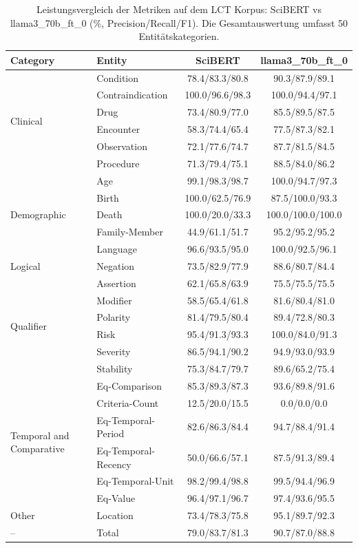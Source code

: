 
\begin{table}[htbp]
\centering
\begin{tabular}{llcc}
\toprule
\textbf{Category} & \textbf{Entity} & \textbf{SciBERT} & \textbf{llama3_70b_ft_0} \\
\midrule
\multirow{6}{*}{Clinical} & Condition & 78.4/83.3/80.8 & 90.3/87.9/89.1 \\
 & Contraindication & 100.0/96.6/98.3 & 100.0/94.4/97.1 \\
 & Drug & 73.4/80.9/77.0 & 85.5/89.5/87.5 \\
 & Encounter & 58.3/74.4/65.4 & 77.5/87.3/82.1 \\
 & Observation & 72.1/77.6/74.7 & 87.7/81.5/84.5 \\
 & Procedure & 71.3/79.4/75.1 & 88.5/84.0/86.2 \\
\midrule
\multirow{5}{*}{Demographic} & Age & 99.1/98.3/98.7 & 100.0/94.7/97.3 \\
 & Birth & 100.0/62.5/76.9 & 87.5/100.0/93.3 \\
 & Death & 100.0/20.0/33.3 & 100.0/100.0/100.0 \\
 & Family-Member & 44.9/61.1/51.7 & 95.2/95.2/95.2 \\
 & Language & 96.6/93.5/95.0 & 100.0/92.5/96.1 \\
\midrule
Logical & Negation & 73.5/82.9/77.9 & 88.6/80.7/84.4 \\
\midrule
\multirow{6}{*}{Qualifier} & Assertion & 62.1/65.8/63.9 & 75.5/75.5/75.5 \\
 & Modifier & 58.5/65.4/61.8 & 81.6/80.4/81.0 \\
 & Polarity & 81.4/79.5/80.4 & 89.4/72.8/80.3 \\
 & Risk & 95.4/91.3/93.3 & 100.0/84.0/91.3 \\
 & Severity & 86.5/94.1/90.2 & 94.9/93.0/93.9 \\
 & Stability & 75.3/84.7/79.7 & 89.6/65.2/75.4 \\
\midrule
\multirow{6}{*}{Temporal and Comparative} & Eq-Comparison & 85.3/89.3/87.3 & 93.6/89.8/91.6 \\
 & Criteria-Count & 12.5/20.0/15.5 & 0.0/0.0/0.0 \\
 & Eq-Temporal-Period & 82.6/86.3/84.4 & 94.7/88.4/91.4 \\
 & Eq-Temporal-Recency & 50.0/66.6/57.1 & 87.5/91.3/89.4 \\
 & Eq-Temporal-Unit & 98.2/99.4/98.8 & 99.5/94.4/96.9 \\
 & Eq-Value & 96.4/97.1/96.7 & 97.4/93.6/95.5 \\
\midrule
Other & Location & 73.4/78.3/75.8 & 95.1/89.7/92.3 \\
\midrule
-- & Total & 79.0/83.7/81.3 & 90.7/87.0/88.8 \\
\bottomrule
\end{tabular}
\caption{Leistungsvergleich der Metriken auf dem LCT Korpus: SciBERT vs llama3_70b_ft_0 (\%, Precision/Recall/F1). Die Gesamtauswertung umfasst 50 Entitätskategorien.}
\label{tab:metrics_comparison}
\end{table}
    